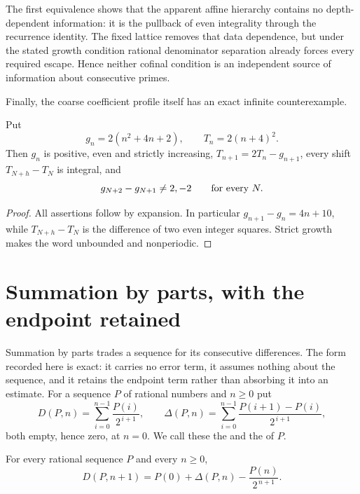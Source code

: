 \documentclass[11pt]{article}
\begin{document}
The first equivalence shows that the apparent affine hierarchy contains no
depth-dependent information: it is the pullback of even integrality through
the recurrence identity.  The fixed lattice removes that data dependence, but
under the stated growth condition rational denominator separation already
forces every required escape.  Hence neither cofinal condition is an
independent source of information about consecutive primes.

Finally, the coarse coefficient profile itself has an exact infinite
counterexample.

\begin{proposition}\label{res:polynomialcountermodel}
Put
\[
 g_n=2(n^2+4n+2),\qquad T_n=2(n+4)^2.
\]
Then $g_n$ is positive, even and strictly increasing,
$T_{n+1}=2T_n-g_{n+1}$, every shift $T_{N+h}-T_N$ is integral, and
\[
 g_{N+2}-g_{N+1}\ne2,-2
 \qquad\hbox{for every }N.
\]
\end{proposition}

\begin{proof}
All assertions follow by expansion.  In particular
$g_{n+1}-g_n=4n+10$, while $T_{N+h}-T_N$ is the difference of two even
integer squares.  Strict growth makes the word unbounded and nonperiodic.
\end{proof}

\section{Summation by parts, with the endpoint retained}\label{sec:parts}

Summation by parts trades a sequence for its consecutive differences.  The form
recorded here is exact: it carries no error term, it assumes nothing about the
sequence, and it retains the endpoint term rather than absorbing it into an
estimate.  For a sequence $P$ of rational numbers and $n\ge0$ put
\[
 D(P,n)=\sum_{i=0}^{n-1}\frac{P(i)}{2^{\,i+1}},
 \qquad
 \Delta(P,n)=\sum_{i=0}^{n-1}\frac{P(i+1)-P(i)}{2^{\,i+1}} ,
\]
both empty, hence zero, at $n=0$.  We call these the
 and the
 of $P$.

\begin{proposition}\label{res:abel}
For every rational sequence $P$ and every $n\ge0$,
\[
 D(P,n+1)=P(0)+\Delta(P,n)-\frac{P(n)}{2^{\,n+1}} .
\]
\end{proposition}
\end{document}

